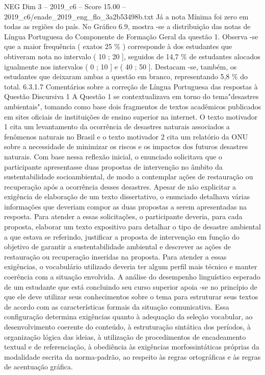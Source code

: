 \begin{textsample}{NEG Dim 3 – 2019\_c6 – Score 15.00 – 2019\_c6/enade\_2019\_eng\_flo\_3a2b53498b.txt}
Já a nota Mínima foi zero em todas as regiões do país.
No Gráfico 6.9, mostra -se a distribuição das notas de Língua Portuguesa do Componente de Formação Geral da questão 1.
Observa -se que a maior frequência ( exatos 25 \% ) corresponde à dos estudantes que obtiveram nota no intervalo ( 10 ; 20 ], seguidos de 14,7 \% de estudantes alocados igualmente nos intervalos ( 0 ; 10 ] e ( 40 ; 50 ].
Destacam -se, também, os estudantes que deixaram ambas a questão em branco, representando 5,8 \% do total. 6.3.1.7 Comentários sobre a correção de Língua Portuguesa das respostas à Questão Discursiva 1 A Questão 1 se contextualizava em torno do tema"desastres ambientais", tomando como base dois fragmentos de textos acadêmicos publicados em sites oficiais de instituições de ensino superior na internet.
O texto motivador 1 cita um levantamento da ocorrência de desastres naturais associados a fenômenos naturais no Brasil e o texto motivador 2 cita um relatório da ONU sobre a necessidade de minimizar os riscos e os impactos dos futuros desastres naturais.
Com base nessa reflexão inicial, o enunciado solicitava que o participante apresentasse duas propostas de intervenção no âmbito da sustentabilidade socioambiental, de modo a contemplar ações de restauração ou recuperação após a ocorrência desses desastres.
Apesar de não explicitar a exigência de elaboração de um texto dissertativo, o enunciado detalhava várias informações que deveriam compor as duas propostas a serem apresentadas na resposta.
Para atender a essas solicitações, o participante deveria, para cada proposta, elaborar um texto expositivo para detalhar o tipo de desastre ambiental a que estava se referindo, justificar a proposta de intervenção em função do objetivo de garantir a sustentabilidade ambiental e descrever as ações de restauração ou recuperação inseridas na proposta.
Para atender a essas exigências, o vocabulário utilizado deveria ter algum perfil mais técnico e manter coerência com a situação envolvida.
A análise do desempenho linguístico esperado de um estudante que está concluindo seu curso superior apoia -se no princípio de que ele deve utilizar seus conhecimentos sobre o tema para estruturar seus textos de acordo com as características formais da situação comunicativa.
Essa configuração determina exigências quanto à adequação da seleção vocabular, ao desenvolvimento coerente do conteúdo, à estruturação sintática dos períodos, à organização lógica das ideias, à utilização de procedimentos de encadeamento textual e de referenciação, à obediência às exigências morfossintáticas próprias da modalidade escrita da norma-padrão, ao respeito às regras ortográficas e às regras de acentuação gráfica.

\end{textsample}
